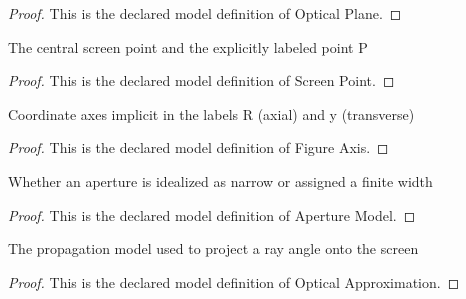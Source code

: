 \begin{proof}
  This is the declared model definition of Optical Plane.
\end{proof}
\begin{definition}
  \label{def:physics:phyx-mini-0120:phyxminiproblems-problemphyxmini0120-screenpoint}
  The central screen point and the explicitly labeled point P
\end{definition}
\begin{proof}
  This is the declared model definition of Screen Point.
\end{proof}
\begin{definition}
  \label{def:physics:phyx-mini-0120:phyxminiproblems-problemphyxmini0120-figureaxis}
  Coordinate axes implicit in the labels R (axial) and y (transverse)
\end{definition}
\begin{proof}
  This is the declared model definition of Figure Axis.
\end{proof}
\begin{definition}
  \label{def:physics:phyx-mini-0120:phyxminiproblems-problemphyxmini0120-aperturemodel}
  Whether an aperture is idealized as narrow or assigned a finite width
\end{definition}
\begin{proof}
  This is the declared model definition of Aperture Model.
\end{proof}
\begin{definition}
  \label{def:physics:phyx-mini-0120:phyxminiproblems-problemphyxmini0120-opticalapproximation}
  The propagation model used to project a ray angle onto the screen
\end{definition}
\begin{proof}
  This is the declared model definition of Optical Approximation.
\end{proof}
